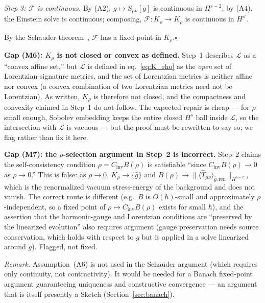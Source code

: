 \documentclass[12pt,a4paper]{article}
\begin{document}
\smallskip\noindent\textit{Step 3: $\mathcal{F}$ is continuous.} By (A2), $g\mapsto
S_{\mu\nu}[g]$ is continuous in $H^{s-2}$; by (A4), the Einstein solve is continuous;
composing, $\mathcal{F}: K_\rho\to K_\rho$ is continuous in $H^{s'}$.

\smallskip\noindent By the Schauder theorem~\cite{schauder}, $\mathcal{F}$ has a fixed
point in $K_\rho$.\hfill$\square$

\smallskip\noindent\textbf{Gap (M6): $K_\rho$ is not closed or convex as defined.}
Step~1 describes $\mathcal{L}$ as a ``convex affine set,'' but $\mathcal{L}$ is defined
in eq.~\eqref{eq:K_rho} as the \emph{open} set of Lorentzian-signature metrics, and the
set of Lorentzian metrics is neither affine nor convex (a convex combination of two
Lorentzian metrics need not be Lorentzian). As written, $K_\rho$ is therefore not closed,
and the compactness and convexity claimed in Step~1 do not follow. The expected repair is
cheap --- for $\rho$ small enough, Sobolev embedding keeps the entire closed $H^s$ ball
inside $\mathcal{L}$, so the intersection with $\mathcal{L}$ is vacuous --- but the proof
must be rewritten to say so; we flag rather than fix it here.

\smallskip\noindent\textbf{Gap (M7): the $\rho$-selection argument in Step~2 is incorrect.}
Step~2 claims the self-consistency condition $\rho = C_{\text{inv}}B(\rho)$ is satisfiable
``since $C_{\text{inv}}B(\rho)\to 0$ as $\rho\to 0$.'' This is false: as $\rho \to 0$,
$K_\rho \to \{\bar{g}\}$ and $B(\rho) \to \|\langle\hat{T}_{\mu\nu}\rangle_{\bar{g},
\text{ren}}\|_{H^{s-2}}$, which is the renormalized vacuum stress-energy of the background
and does not vanish. The correct route is different (e.g.\ $B$ is $O(\hbar)$-small and
approximately $\rho$-independent, so a fixed point of $\rho \mapsto C_{\text{inv}}B(\rho)$
exists for small $\hbar$), and the assertion that the harmonic-gauge and Lorentzian
conditions are ``preserved by the linearized evolution'' also requires argument (gauge
preservation needs source conservation, which holds with respect to $g$ but is applied in
a solve linearized around $\bar{g}$). Flagged, not fixed.

\noindent\emph{Remark.} Assumption~(A6) is not used in the Schauder argument (which
requires only continuity, not contractivity). It would be needed for a Banach fixed-point
argument guaranteeing uniqueness and constructive convergence --- an argument that is
itself presently a Sketch (Section~\ref{sec:banach}).

\end{document}

